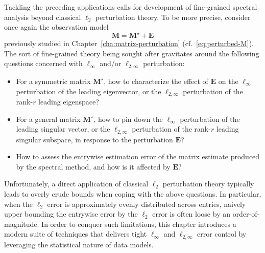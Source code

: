 Tackling the preceding applications calls for development of fine-grained spectral analysis beyond classical $\ell_2$ perturbation theory.  To be more precise, consider once again the observation model
$$
\bm{M}=\bm{M}^{\star} + \bm{E}
$$  previously studied in Chapter~\ref{cha:matrix-perturbation} (cf.~\eqref{eq:perturbed-M}). The sort of fine-grained theory being sought after gravitates around the following questions concerned with $\ell_{\infty}$ and/or $\ell_{2,\infty}$ perturbation:
%
\begin{itemize}
	\item For a symmetric matrix $\bm{M}^{\star}$, how to characterize the effect of $\bm{E}$ on the $\ell_{\infty}$ perturbation  of the leading eigenvector,
		or the $\ell_{2,\infty}$ perturbation of the rank-$r$ leading eigenspace?
	\item For a general matrix $\bm{M}^{\star}$, how to pin down the $\ell_{\infty}$ perturbation of the leading singular vector, or the $\ell_{2,\infty}$ perturbation  of the rank-$r$ leading singular subspace, in response to the perturbation $\bm{E}$?
	\item How to assess the entrywise estimation error of the matrix estimate produced by the spectral method, and how is it affected by $\bm{E}$?
\end{itemize}
%
Unfortunately, a direct application of classical $\ell_2$ perturbation theory typically leads to overly crude bounds when coping with the above questions.  In particular, when the $\ell_2$ error is approximately evenly distributed across entries, naively upper bounding the entrywise error by the $\ell_2$ error is often loose by an order-of-magnitude.
In order to conquer such limitations,
this chapter introduces a modern suite of techniques that delivers tight $\ell_\infty$ and $\ell_{2,\infty}$ error control by leveraging the statistical nature of data models. 













 







